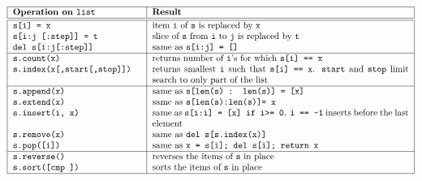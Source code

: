 $$\label{tab:listes}\begin{tabular}{|p{5cm}|p{10cm}|}
\hline
\bf Operation on {\tt list}	&	\bf Result \\
\hline
\hline
\tt s[i] = x 			& item {\tt i} of {\tt s} is replaced by {\tt x} 	\\
\tt s[i:j [:step]] = t 		& slice of {\tt s} from {\tt i} to {\tt j} is replaced by {\tt t} \\	 
\tt del s[i:j[:step]] 		& same as {\tt s[i:j] = []} \\	 
\hline
\tt s.count(x) 			& returns number of {\tt i}'s for which {\tt s[i] == x} \\	 
\tt s.index(x[,start[,stop]]) 	& returns smallest {\tt i} such that {\tt s[i] == x}. 
				  {\tt start} and {\tt stop} limit search to only part 
				  of the list \\ 	
\hline
\tt s.append(x) 		& same as {\tt s[len(s) : len(s)] = [x]} \\	 
\tt s.extend(x) 		& same as {\tt s[len(s):len(s)]= x} \\	
\tt s.insert(i, x) 		& same as {\tt s[i:i] = [x] if i>= 0}. {\tt i == -1} inserts before the last element\\ 	 
\tt s.remove(x) 		& same as {\tt del s[s.index(x)]} \\
\tt s.pop([i]) 			& same as {\tt x = s[i]; del s[i]; return x} 	\\
\hline
\tt s.reverse() 		& reverses the items of {\tt s} in place \\	
\tt s.sort([cmp ]) 		& sorts the items of {\tt s} in place \\   
\hline
\end{tabular}$$ 

